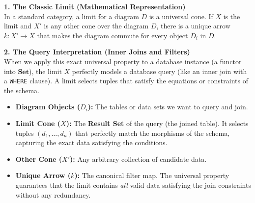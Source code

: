 \documentclass{article}
\begin{document}
\textbf{1. The Classic Limit (Mathematical Representation)} \\
In a standard category, a limit for a diagram $D$ is a universal cone. If $X$ is the limit and $X'$ is any other cone over the diagram $D$, there is a unique arrow $k: X' \to X$ that makes the diagram commute for every object $D_i$ in $D$.

\begin{center}
\end{center}

\textbf{2. The Query Interpretation (Inner Joins and Filters)} \\
When we apply this exact universal property to a database instance (a functor into $\mathbf{Set}$), the limit $X$ perfectly models a database query (like an inner join with a \texttt{WHERE} clause). A limit selects tuples that satisfy the equations or constraints of the schema.

\begin{itemize}
    \item \textbf{Diagram Objects ($D_i$):} The tables or data sets we want to query and join.
    \item \textbf{Limit Cone ($X$):} The \textbf{Result Set} of the query (the joined table). It selects tuples $(d_1, \dots, d_n)$ that perfectly match the morphisms of the schema, capturing the exact data satisfying the conditions.
    \item \textbf{Other Cone ($X'$):} Any arbitrary collection of candidate data.
    \item \textbf{Unique Arrow ($k$):} The canonical filter map. The universal property guarantees that the limit contains \textit{all} valid data satisfying the join constraints without any redundancy.
\end{itemize}

\begin{center}
\end{center}
\end{document}

